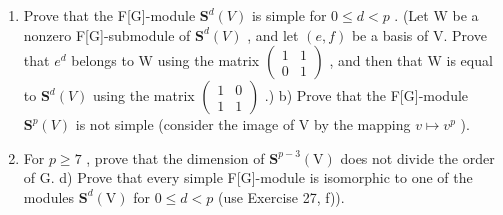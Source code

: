 \begin{enumerate}
\def\labelenumi{\alph{enumi})}
\item
  Prove that the F{[}G{]}-module \(\mathbf{S}^{d}(V)\) is simple for \(0 \leqslant d < p\) . (Let W be a nonzero F{[}G{]}-submodule of \(\mathbf{S}^{d}(V)\) , and let \((e, f)\) be a basis of V. Prove that \(e^{d}\) belongs to W using the matrix \(\begin{pmatrix}1 & 1 \\ 0 & 1\end{pmatrix}\) , and then that W is equal to \(\mathbf{S}^{d}(V)\) using the matrix \(\begin{pmatrix}1 & 0 \\ 1 & 1\end{pmatrix}\) .) b) Prove that the F{[}G{]}-module \(\mathbf{S}^{p}(V)\) is not simple (consider the image of V by the mapping \(v \mapsto v^{p}\) ).
\setcounter{enumi}{2}
\item
  For \(p \geqslant 7\) , prove that the dimension of \(\mathbf{S}^{p-3}(\mathrm{V})\) does not divide the order of G. d) Prove that every simple F{[}G{]}-module is isomorphic to one of the modules \(\mathbf{S}^{d}(\mathrm{V})\) for \(0 \leqslant d < p\) (use Exercise 27, f)).
\end{enumerate}

\appendix
\renewcommand{\thechapter}{\arabic{chapter}}
